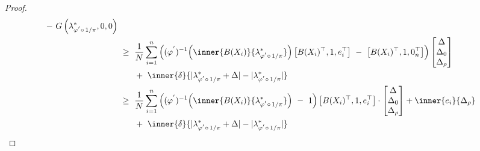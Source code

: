 \begin{proof}
\begin{align*}
   \ 
   -
   \ 
   G
   \left(
\lambda^*_{\varphi^{'}\circ\,1/\pi}
,0,0
   \right)
   \\
   &
   \ 
   \ge
   \ 
   \frac{1}{N}
\sum_{i=1} 
  ^n
  \left( 
  (
  \varphi^{'}
  )
  ^{-1}
  \!
  \left( 
\inner
{B(X_i)}
{
\lambda^*_{\varphi^{'}\circ\,1/\pi}
}
  \right)
  \left[ 
    B(X_i)^\top,1,e_i^\top
  \right]
  \ 
  -
  \ 
  \left[ 
    B(X_i)^\top,1,0_n^\top
  \right]
  \right)
  \begin{bmatrix}
    \Delta
    \\
    \Delta_0
    \\
    \Delta_\rho
  \end{bmatrix}
  \\
  &
  \qquad
  +
  \ 
  \inner{\delta}
  {|
\lambda^*_{\varphi^{'}\circ\,1/\pi}
+
\Delta
  |
  -
  |
\lambda^*_{\varphi^{'}\circ\,1/\pi}
  |
}
\\
   &
   \ 
   \ge
   \ 
   \frac{1}{N}
\sum_{i=1} 
  ^n
  \left( 
  (
  \varphi^{'}
  )
  ^{-1}
  \!
  \left( 
\inner
{B(X_i)}
{
\lambda^*_{\varphi^{'}\circ\,1/\pi}
}
  \right)
  \ 
  -
  \ 
  1
  \right)
  \left[ 
    B(X_i)^\top,1,e_i^\top
  \right]
  \cdot
  \begin{bmatrix}
    \Delta
    \\
    \Delta_0
    \\
    \Delta_\rho
  \end{bmatrix}
  +
  \inner{e_i}{\Delta_\rho}
  \\
  &
  \qquad
  +
  \ 
  \inner{\delta}
  {|
\lambda^*_{\varphi^{'}\circ\,1/\pi}
+
\Delta
  |
  -
  |
\lambda^*_{\varphi^{'}\circ\,1/\pi}
  |
}
\end{align*}
 \end{proof}

